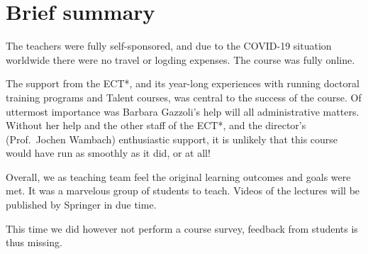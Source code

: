 \documentclass[prc,amsart,english]{revtex4}
\begin{document}
\section{Brief summary}

The teachers were fully self-sponsored, and due to the COVID-19
situation worldwide there were no travel or logding expenses. The course was
fully online.

The support from the ECT*, and its year-long experiences with running doctoral training programs and Talent courses, was central to the success of the course. Of uttermost importance was Barbara Gazzoli's help will all administrative matters.  Without her help and the other staff of the ECT*, and the director's (Prof.~Jochen Wambach) 
enthusiastic support,  it is unlikely that this course would have run as smoothly as it did, or at all! 


Overall, we as teaching team feel the original learning outcomes and goals were met. It was a marvelous group of students to teach. Videos of the lectures will be published by Springer in due time.

This time we did however not perform a course survey, feedback from students is thus missing.
\end{document}
